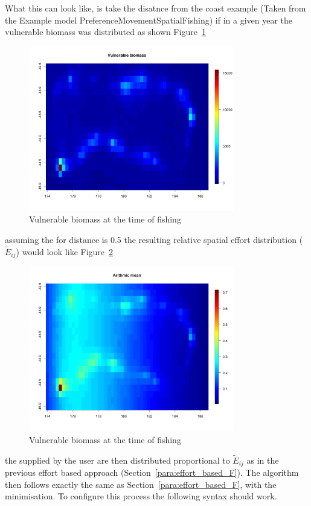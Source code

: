 %
What this can look like, is take the disatnce from the coast example (Taken from the Example model PreferenceMovementSpatialFishing) if in a given year the vulnerable biomass was distributed as shown Figure~\ref{fig:vulnerable}
\begin{figure}[H]
	\centering
	\includegraphics[width=9cm]{Figures/vulnerable_biomass.png} 
	\caption{Vulnerable biomass at the time of fishing}
	\label{fig:vulnerable}%
\end{figure}
%
assuming the  for distance is 0.5 the resulting relative spatial effort distribution (\(\tilde{E}_{ij}\)) would look like Figure~\ref{fig:WIFD}
\begin{figure}[H]
	\centering
	\includegraphics[width=9cm]{Figures/WIFD_arithmic.png} 
	\caption{Vulnerable biomass at the time of fishing}
	\label{fig:WIFD}%
\end{figure}
%
the  supplied by the user are then distributed proportional to \(\tilde{E}_{ij}\) as in the previous effort based approach (Section~\ref{para:effort_based_F}). The algorithm then follows exactly the same as Section~\ref{para:effort_based_F}, with the minimisation. To configure this process the following syntax should work.

